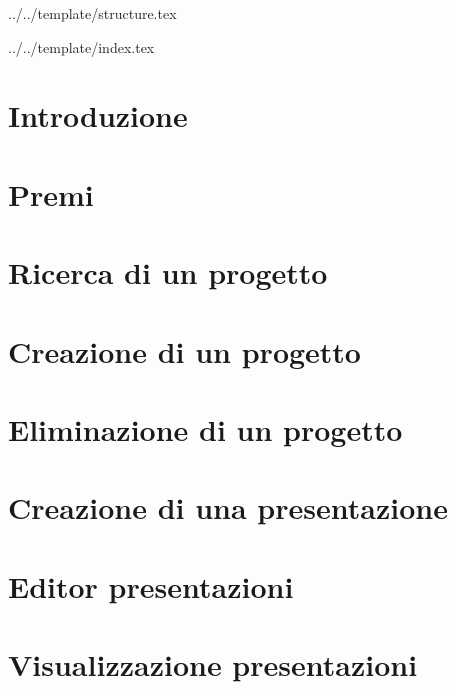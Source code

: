 

\def\DOCUMENTO{Manuale Utente}
\def\VERSIONE{1.0.0}

\def\DESCRIZIONE{Documento che facilita l'utilizzo dell'applicazione da parte dell'utente.}

\def\REDATTORE {Crespan Emanuele}
\def\VERIFICATORE {Agostinetto Matteo}
\def\RESPONSABILE {Suierica Bogdan}

\def\USO {Esterno}

\def\DISTRIBUZIONE {\GRUPPO{}\\ & \COMMITTENTE{}\\ & Piccoli Gregorio, \textit{Zucchetti spa}\\}


\def\INDICE	{true}
\def\TABELLE {true}
\def\FIGURE {true}


 {../../template/structure.tex}


 {../../template/index.tex}

\section{Introduzione}

\newpage

\section{Premi}

\newpage

\section{Ricerca di un progetto}

\newpage

\section{Creazione di un progetto}


\section{Eliminazione di un progetto}


\section{Creazione di una presentazione}

\newpage

\section{Editor presentazioni}

\newpage


\section{Visualizzazione presentazioni}

\newpage






